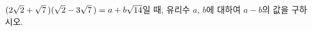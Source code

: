$(2\sqrt{2}+\sqrt{7}\mkern3mu )(\sqrt{2}-3\sqrt{7}\mkern3mu )=a+b\sqrt{14}$일 때, 유리수 $a$, $b$에 대하여 $a-b$의 값을 구하시오.
